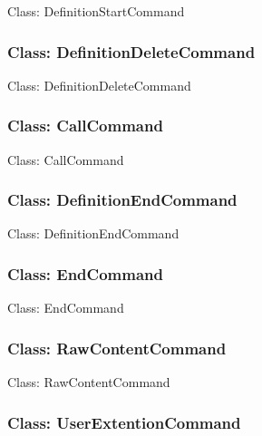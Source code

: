 \documentclass[11pt,twoside,openany,x11names,svgnames]{memoir}
\begin{document}
Class: DefinitionStartCommand

\subsubsection{Class: DefinitionDeleteCommand}\label{Class-DefinitionDeleteCommand}

Class: DefinitionDeleteCommand

\subsubsection{Class: CallCommand}\label{Class-CallCommand}

Class: CallCommand

\subsubsection{Class: DefinitionEndCommand}\label{Class-DefinitionEndCommand}

Class: DefinitionEndCommand

\subsubsection{Class: EndCommand}\label{Class-EndCommand}

Class: EndCommand

\subsubsection{Class: RawContentCommand}\label{Class-RawContentCommand}

Class: RawContentCommand

\subsubsection{Class: UserExtentionCommand}\label{Class-UserExtentionCommand}
\end{document}
